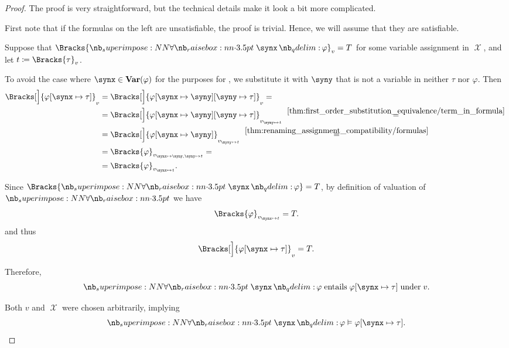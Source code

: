 \begin{proof}
  The proof is very straightforward, but the technical details make it look a bit more complicated.

  First note that if the formulas on the left are unsatisfiable, the proof is trivial. Hence, we will assume that they are satisfiable.

   Suppose that \( \Bracks{\qforall \synx \varphi}_v = T \) for some variable assignment in \( \mscrX \), and let \( t \coloneqq \Bracks{\tau}_v \).

  To avoid the case where \( \synx \in \op*{Var}(\varphi) \) for the purposes for , we substitute it with \( \syny \) that is not a variable in neither \( \tau \) nor \( \varphi \). Then
  \begin{align*}
    \Bracks[\Big]{\varphi[\synx \mapsto \tau]}_v
    &=
    \Bracks[\Big]{\varphi[\synx \mapsto \syny][\syny \mapsto \tau]}_v
    = \\ &=
    \Bracks[\Big]{\varphi[\synx \mapsto \syny][\syny \mapsto \tau]}_{v_{\syny \mapsto t}}
    \reloset {\ref{thm:first_order_substitution_equivalence/term_in_formula}} = \\ &=
    \Bracks[\Big]{\varphi[\synx \mapsto \syny]}_{v_{\syny \mapsto t}}
    \reloset {\ref{thm:renaming_assignment_compatibility/formulas}} = \\ &=
    \Bracks{\varphi}_{v_{\synx \mapsto \syny, \syny \mapsto t}}
    = \\ &=
    \Bracks{\varphi}_{v_{\synx \mapsto t}}.
  \end{align*}

  Since \( \Bracks{\qforall \synx \varphi} = T \), by definition of valuation of \( \synforall \) we have
  \begin{equation*}
    \Bracks{\varphi}_{v_{\synx \mapsto t}} = T.
  \end{equation*}
  and thus
  \begin{equation*}
    \Bracks[\Big]{\varphi[\synx \mapsto \tau]}_v = T.
  \end{equation*}

  Therefore,
  \begin{equation*}
    \qforall \synx \varphi \T{entails} \varphi[\synx \mapsto \tau] \T{under} v.
  \end{equation*}

  Both \( v \) and \( \mscrX \) were chosen arbitrarily, implying
  \begin{equation*}
    \qforall \synx \varphi \vDash \varphi[\synx \mapsto \tau].
  \end{equation*}


\end{proof}
